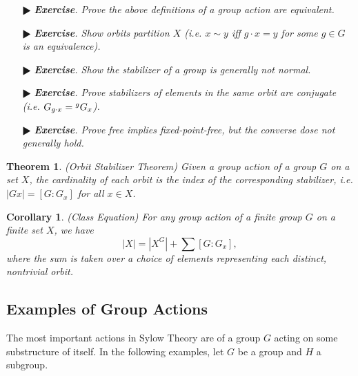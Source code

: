 \documentclass[11pt]{amsart}
\newtheorem*{theorem*}{Theorem}
\newtheorem*{corollary*}{Corollary}
\theoremstyle{definition}
\renewcommand\:{\colon}
\newcommand{\1}{\mathds{1}}
\newcommand{\exc}[1]{\vspace{-2.5pt}\begin{itemize}[leftmargin=15pt]\item[$\RHD$] \textit{\textbf{Exercise}. #1}\end{itemize}}
\begin{document}
\exc{Prove the above definitions of a group action are equivalent.}
\exc{Show orbits partition $X$ (i.e. $x \sim y$ iff $g \cdot x = y$ for some $g \in G$ is an equivalence).}
\exc{Show the stabilizer of a group is generally not normal.}
\exc{Prove stabilizers of elements in the same orbit are conjugate (i.e. $G_{g \cdot x} = \null^gG_x$).}
\exc{Prove free implies fixed-point-free, but the converse dose not generally hold.}

\begin{theorem*}
	\textnormal{(Orbit Stabilizer Theorem)} Given a group action of a group $G$ on a set  $X$, the cardinality of each orbit is the index of the corresponding stabilizer, i.e. $|Gx| = [G : G_x]$ for all $x \in X$.
\end{theorem*}

\begin{corollary*}
	\textnormal{(Class Equation)} For any group action of a finite group $G$ on a finite set $X$, we have
		\[ |X| = |X^G| + \sum [G:G_x], \]
	where the sum is taken over a choice of elements representing each distinct, nontrivial orbit.
\end{corollary*}

\subsection*{Examples of Group Actions}

The most important actions in Sylow Theory are of a group $G$ acting on some substructure of itself. In the following examples, let $G$ be a group and $H$ a subgroup.
\end{document}
